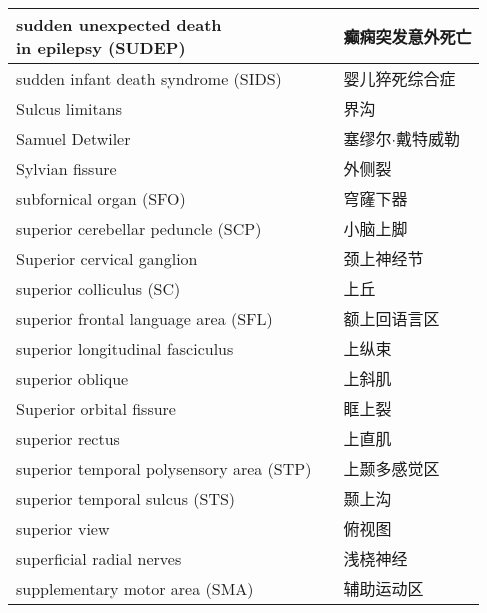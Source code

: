 \begin{longtable}{lll}
	\midrule
	\makecell[l]{sudden unexpected death \\in epilepsy (SUDEP)}  && 癫痫突发意外死亡 \\
	
	\midrule
	sudden infant death syndrome (SIDS)  && 婴儿猝死综合症 \\
	
	\midrule
	Sulcus limitans   && 界沟 \\
	
	\midrule
	Samuel Detwiler   && 塞缪尔$\cdot$戴特威勒 \\
	
	\midrule
	Sylvian fissure   && 外侧裂 \\
	
	\midrule
	subfornical organ (SFO)  && 穹窿下器 \\
	
	\midrule
	superior cerebellar peduncle (SCP)  && 小脑上脚 \\
	
	\midrule
	Superior cervical ganglion   && 颈上神经节 \\
	
	\midrule
	superior colliculus (SC)  && 上丘 \\
	
	\midrule
	superior frontal language area (SFL) && 额上回语言区 \\
	
	\midrule
	superior longitudinal fasciculus   && 上纵束 \\
	
	\midrule
	superior oblique   && 上斜肌 \\
	
	\midrule
	Superior orbital fissure   && 眶上裂 \\
	
	\midrule
	superior rectus   && 上直肌 \\
	
	\midrule
	superior temporal polysensory area (STP)   && 上颞多感觉区 \\
	
	\midrule
	superior temporal sulcus (STS)   && 颞上沟 \\
	
	\midrule
	superior view   && 俯视图 \\
	
	\midrule
	superficial radial nerves   && 浅桡神经 \\
	
	\midrule
	supplementary motor area (SMA)   && 辅助运动区 \\
	

\end{longtable}
